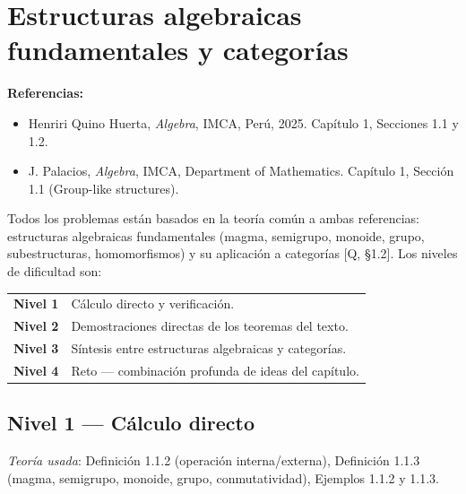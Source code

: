 \section{Estructuras algebraicas fundamentales y categorías}

\textbf{Referencias:}
\begin{itemize}
    \item[{[Q]}] Henriri Quino Huerta, \textit{Algebra}, IMCA, Perú, 2025.
    Capítulo 1, Secciones 1.1 y 1.2.
    \item[{[P]}] J. Palacios, \textit{Algebra}, IMCA, Department of Mathematics.
    Capítulo 1, Sección 1.1 (Group-like structures).
\end{itemize}

Todos los problemas están basados en la teoría común a ambas referencias:
estructuras algebraicas fundamentales (magma, semigrupo, monoide, grupo,
subestructuras, homomorfismos) y su aplicación a categorías [Q, §1.2].
Los niveles de dificultad son:

\begin{center}
\begin{tabular}{cl}
    \textbf{Nivel 1} & Cálculo directo y verificación. \\
    \textbf{Nivel 2} & Demostraciones directas de los teoremas del texto. \\
    \textbf{Nivel 3} & Síntesis entre estructuras algebraicas y categorías. \\
    \textbf{Nivel 4} & Reto --- combinación profunda de ideas del capítulo. \\
\end{tabular}
\end{center}

\subsection*{Nivel 1 --- Cálculo directo}

\textit{Teoría usada}: Definición 1.1.2 (operación interna/externa), Definición 1.1.3
(magma, semigrupo, monoide, grupo, conmutatividad), Ejemplos 1.1.2 y 1.1.3.

\bigskip

